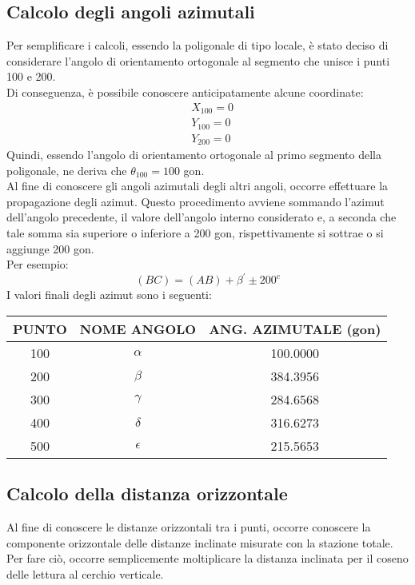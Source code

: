 \subsection{Calcolo degli angoli azimutali}
Per semplificare i calcoli, essendo la poligonale di tipo locale, è stato deciso di considerare l'angolo di orientamento ortogonale al segmento che unisce i punti 100 e 200.\\
Di conseguenza, è possibile conoscere anticipatamente alcune coordinate:
\begin{equation}\begin{split}
  &  X_{100}=0  \\ 
  &  Y_{100}=0  \\
  &  Y_{200}=0
\end{split}\end{equation}
Quindi, essendo l'angolo di orientamento ortogonale al primo segmento della poligonale, ne deriva che $\theta_{100}=100$ gon.\\
Al fine di conoscere gli angoli azimutali degli altri angoli, occorre effettuare la propagazione degli azimut. Questo procedimento avviene sommando l'azimut dell'angolo precedente, il valore dell'angolo interno considerato e, a seconda che tale somma sia superiore o inferiore a 200 gon, rispettivamente si sottrae o si aggiunge 200 gon.\\
Per esempio: 
\begin{equation}
    (BC)= (AB) + \beta^{'} \pm 200^c
\end{equation}
I valori finali degli azimut sono i seguenti:
\begin{table}[H] \centering
\begin{tabular}{ccc}
\toprule
PUNTO & NOME ANGOLO             & ANG. AZIMUTALE (gon) \\
\midrule
100   & $\alpha$   & 100.0000                    \\
200   & $\beta$    & 384.3956                   \\
300   & $\gamma$   & 284.6568                   \\
400   & $\delta$   & 316.6273                   \\
500   & $\epsilon$ & 215.5653                   \\
\midrule
\end{tabular}
\end{table}

\subsection{Calcolo della distanza orizzontale}
Al fine di conoscere le distanze orizzontali tra i punti, occorre conoscere la componente orizzontale delle distanze inclinate misurate con la stazione totale.\\
Per fare ciò, occorre semplicemente moltiplicare la distanza inclinata per il coseno delle lettura al cerchio verticale.\\

